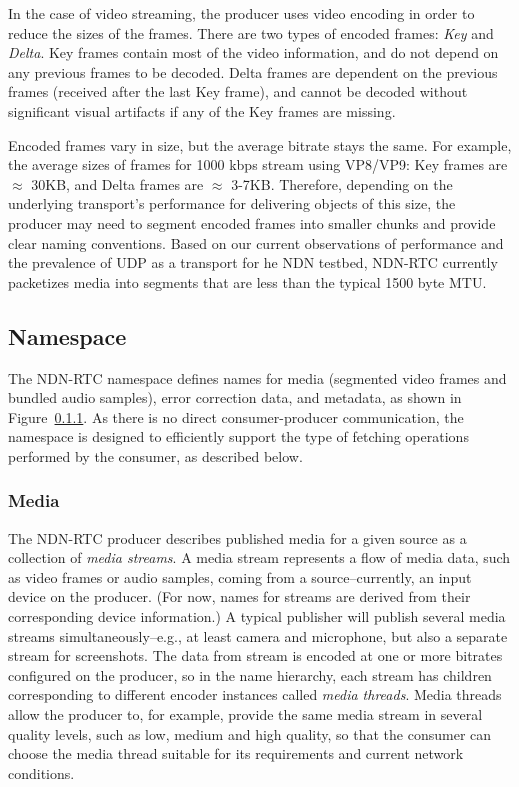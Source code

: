 \documentclass{icn/sig-alternate-2012} %
\newcommand{\ndnrtcName}{NDN-RTC} %
\begin{document}
In the case of video streaming, the producer uses video encoding in order to reduce the sizes of the frames. There are two types of encoded frames: \textit{Key} and \textit{Delta}. Key frames contain most of the video information, and do not depend on any previous frames to be decoded. Delta frames are dependent on the previous frames (received after the last Key frame), and cannot be decoded without significant visual artifacts if any of the Key frames are missing.

Encoded frames vary in size, but the average bitrate stays the same. For example, the average sizes of frames for 1000 kbps stream using VP8/VP9: Key frames are $\approx$ 30KB, and Delta frames are $\approx$ 3-7KB.
Therefore, depending on the underlying transport's performance for delivering objects of this size, the producer may need to segment encoded frames into smaller chunks and provide clear naming conventions. Based on our current observations of performance and the prevalence of UDP as a transport for he NDN testbed, \ndnrtcName{} currently packetizes media into segments that are less than the typical 1500 byte MTU. 

\subsection{Namespace}

The \ndnrtcName{} namespace defines names for media (segmented video frames and bundled audio samples), error correction data, and metadata, as shown in Figure~\ref{}.  As there is no direct consumer-producer communication, the namespace is designed to efficiently support the type of fetching operations performed by the consumer, as described below. 

\subsubsection{Media} 

The \ndnrtcName{} producer describes published media for a given source as a collection of \textit{media streams}. A media stream represents a flow of media data, such as video frames or audio samples, coming from a source--currently, an input device on the producer. (For now, names for streams are derived from their corresponding device information.) A typical publisher will publish several media streams simultaneously--e.g., at least camera and microphone, but also a separate stream for screenshots.  The data from stream is encoded at one or more bitrates configured on the producer, so in the name hierarchy, each stream has children corresponding to different encoder instances called \textit{media threads}. Media threads allow the producer to, for example, provide the same media stream in several quality levels, such as low, medium and high quality, so that the consumer can choose the media thread suitable for its requirements and current network conditions.
\end{document}
